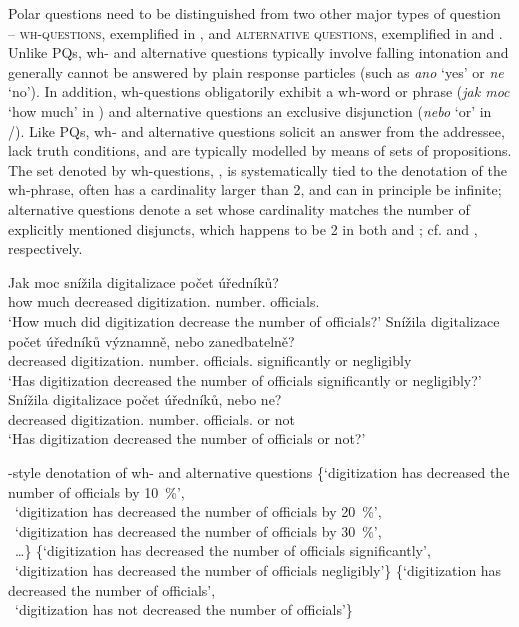 \documentclass[output=paper,colorlinks,citecolor=brown]{langscibook}
\begin{document}
\noindent Polar questions need to be distinguished from two other major types of question -- \textsc{wh-questions}, exemplified in , and \textsc{alternative questions}, exemplified in  and . Unlike PQs, wh- and alternative questions typically involve falling intonation and generally cannot be answered by plain response particles (such as \textit{ano} `yes' or \textit{ne} `no'). In addition, wh-questions obligatorily exhibit a wh-word or phrase (\textit{jak moc} `how much' in ) and alternative questions an exclusive disjunction (\textit{nebo} `or' in /). Like PQs, wh- and alternative questions solicit an answer from the addressee, lack truth conditions, and are typically modelled by means of sets of propositions. The set denoted by wh-questions, , is systematically tied to the denotation of the wh-phrase, often has a cardinality larger than 2, and can in principle be infinite; alternative questions denote a set whose cardinality matches the number of explicitly mentioned disjuncts, which happens to be 2 in both  and ; cf.  and , respectively.

\ea\ea \gll Jak moc snížila digitalizace počet úředníků?\label{sim:ex:wh-cz}\\
how much decreased digitization.{\NOM} number.{\ACC} officials.{\GEN}\\
\glt `How much did digitization decrease the number of officials?'
\ex \gll Snížila digitalizace počet úředníků významně, nebo zanedbatelně?\label{sim:ex:altq2-cz}\\
decreased digitization.{\NOM} number.{\ACC} officials.{\GEN} significantly or negligibly\\
\glt `Has digitization decreased the number of officials significantly or negligibly?'
\ex\gll Snížila digitalizace počet úředníků, nebo ne?\label{sim:ex:altq1-cz}\\
decreased digitization.{\NOM} number.{\ACC} officials.{\GEN} or not\\
\glt `Has digitization decreased the number of officials or not?'
\z\z

\ea \citet{Hamblin1973}-style denotation of wh- and alternative questions
\ea \{`digitization has decreased the number of officials by \qty{10}{\percent}',\\ ~`digitization has decreased the number of officials by \qty{20}{\percent}',\\
~`digitization has decreased the number of officials by \qty{30}{\percent}',\\
~\dots\}\label{sim:denot-wh}
\ex \{`digitization has decreased the number of officials significantly',\\
~`digitization has decreased the number of officials negligibly'\}\label{sim:denot-altq2}
\ex \{`digitization has decreased the number of officials',\\
~`digitization has not decreased the number of officials'\}\label{sim:denot-altq1}
\z\z
\end{document}
